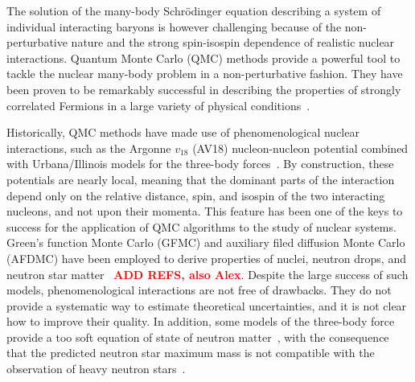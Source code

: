 \documentclass[aps,prc,twocolumn,superscriptaddress,floatfix]{revtex4-1}
\newcommand{\red}[1]{\protect\textcolor{red}{#1}}
\begin{document}
The solution of the many-body Schr\"odinger equation describing a system of individual 
interacting baryons is however challenging because of the non-perturbative 
nature and the strong spin-isospin dependence of realistic nuclear interactions. 
Quantum Monte Carlo (QMC) methods provide a powerful tool to tackle the nuclear 
many-body problem in a non-perturbative fashion. They have been proven to be 
remarkably successful in describing the properties of strongly correlated 
Fermions in a large variety of physical conditions~\cite{Carlson:2015}. 

Historically, QMC methods have made use of phenomenological nuclear interactions, 
such as the Argonne $v_{18}$ (AV18) nucleon-nucleon potential combined
with Urbana/Illinois models for the three-body forces~\cite{Carlson:2015}.
By construction, these potentials are nearly local, meaning that the dominant parts 
of the interaction depend only on the relative distance, spin, and isospin of the
two interacting nucleons, and not upon their momenta.
This feature has been one of the keys to success
for the application of QMC algorithms to the study of nuclear systems. Green's function
Monte Carlo (GFMC) and auxiliary filed diffusion Monte Carlo (AFDMC) have been employed 
to derive properties of nuclei, neutron drops, and neutron star matter~\cite{Carlson:2015} \red{\bf ADD REFS, also Alex}. 
Despite the large success of such models, phenomenological interactions are not free of
drawbacks. They do not provide a systematic way to estimate theoretical uncertainties, 
and it is not clear how to improve their quality. In addition, some models of the 
three-body force provide a too soft equation of state of neutron matter~\cite{Sarsa:2003,Maris:2013},
with the consequence that the predicted neutron star maximum mass is not compatible
with the observation of heavy neutron stars~\cite{Demorest:2010,Antoniadis:2013}.
\end{document}
